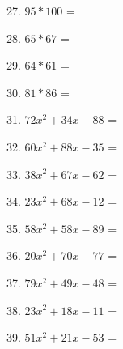 \documentclass[12pt]{article}
\begin{document}
27. $95 * 100$ = \underline{\hspace{2 in}}




28. $65 * 67$ = \underline{\hspace{2 in}}




29. $64 * 61$ = \underline{\hspace{2 in}}




30. $81 * 86$ = \underline{\hspace{2 in}}







31. $72x^{2} + 34x -88$ = \underline{\hspace{2 in}}





32. $60x^{2} + 88x -35$ = \underline{\hspace{2 in}}





33. $38x^{2} + 67x -62$ = \underline{\hspace{2 in}}





34. $23x^{2} + 68x -12$ = \underline{\hspace{2 in}}





35. $58x^{2} + 58x -89$ = \underline{\hspace{2 in}}





36. $20x^{2} + 70x -77$ = \underline{\hspace{2 in}}





37. $79x^{2} + 49x -48$ = \underline{\hspace{2 in}}





38. $23x^{2} + 18x -11$ = \underline{\hspace{2 in}}





39. $51x^{2} + 21x -53$ = \underline{\hspace{2 in}}
\end{document}

